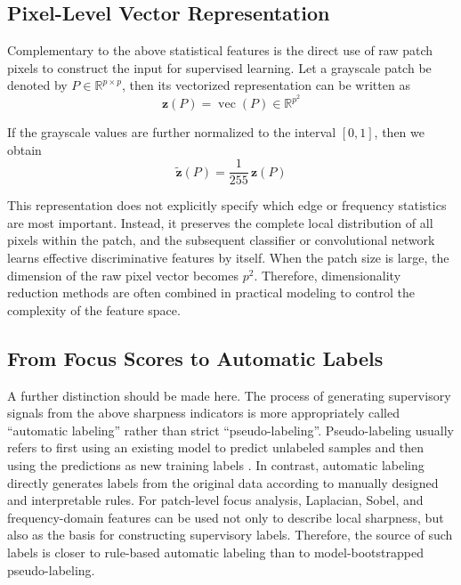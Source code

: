 \subsection{Pixel-Level Vector Representation}
\par Complementary to the above statistical features is the direct use of raw
patch pixels to construct the input for supervised learning. Let a grayscale
patch be denoted by $P\in\mathbb{R}^{p\times p}$, then its vectorized
representation can be written as
\begin{equation}
    \mathbf{z}(P)=\operatorname{vec}(P)\in\mathbb{R}^{p^2}
    \label{eq:pixel-vector-basic}
\end{equation}
\par If the grayscale values are further normalized to the interval $[0,1]$,
then we obtain
\begin{equation}
    \tilde{\mathbf{z}}(P)=\frac{1}{255}\,\mathbf{z}(P)
    \label{eq:pixel-vector-normalized}
\end{equation}
\par This representation does not explicitly specify which edge or frequency
statistics are most important. Instead, it preserves the complete local
distribution of all pixels within the patch, and the subsequent classifier or
convolutional network learns effective discriminative features by itself. When
the patch size is large, the dimension of the raw pixel vector becomes $p^2$.
Therefore, dimensionality reduction methods are often combined in practical
modeling to control the complexity of the feature space.

\subsection{From Focus Scores to Automatic Labels}
\par A further distinction should be made here. The process of generating
supervisory signals from the above sharpness indicators is more appropriately
called ``automatic labeling'' rather than strict ``pseudo-labeling''.
Pseudo-labeling usually refers to first using an existing model to predict
unlabeled samples and then using the predictions as new training labels
\cite{lee2013pseudo}. In contrast, automatic labeling directly generates labels
from the original data according to manually designed and interpretable rules.
For patch-level focus analysis, Laplacian, Sobel, and frequency-domain features
can be used not only to describe local sharpness, but also as the basis for
constructing supervisory labels. Therefore, the source of such labels is closer
to rule-based automatic labeling \cite{5739529,1284395} than to model-bootstrapped
pseudo-labeling.

